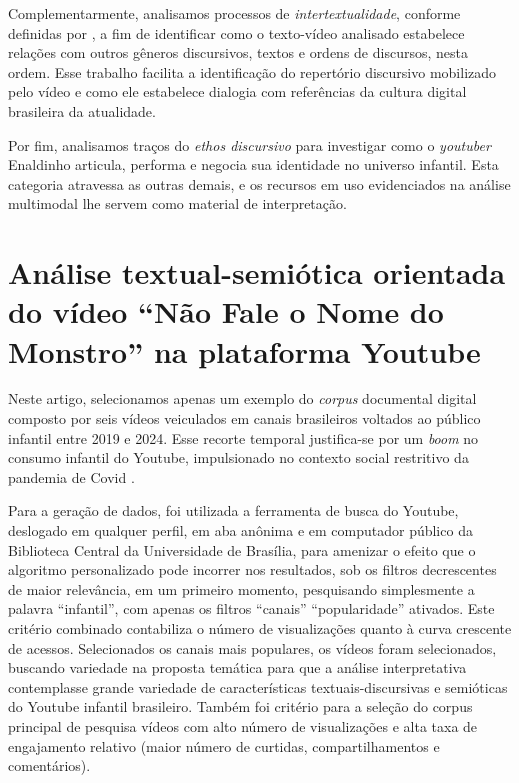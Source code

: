 \documentclass[portuguese]{textolivre}
\begin{document}
Complementarmente, analisamos processos de \textit{intertextualidade}, conforme definidas por \textcite{Fairclough2003AnalysingDiscourse}, a fim de identificar como o texto-vídeo analisado estabelece relações com outros gêneros discursivos, textos e ordens de discursos, nesta ordem. Esse trabalho facilita a identificação do repertório discursivo mobilizado pelo vídeo e como ele estabelece dialogia com referências da cultura digital brasileira da atualidade.

Por fim, analisamos traços do \textit{ethos discursivo} \cite{Maingueneau2020GenerosWeb} para investigar como o \textit{youtuber} Enaldinho articula, performa e negocia sua identidade no universo infantil. Esta categoria atravessa as outras demais, e os recursos em uso evidenciados na análise multimodal lhe servem como material de interpretação.

\section{Análise textual-semiótica orientada do vídeo “Não Fale o Nome do Monstro” na plataforma Youtube}\label{sec-fmt-manuscrito}
Neste artigo, selecionamos apenas um exemplo do \textit{corpus} documental digital composto por seis vídeos veiculados em canais brasileiros voltados ao público infantil entre 2019 e 2024. Esse recorte temporal justifica-se por um \textit{boom} no consumo infantil do Youtube, impulsionado no contexto social restritivo da pandemia de Covid \cite{FuenteAlbaVelosoVergara2021YouTubeInfantil}.

Para a geração de dados, foi utilizada a ferramenta de busca do Youtube, deslogado em qualquer perfil, em aba anônima e em computador público da Biblioteca Central da Universidade de Brasília, para amenizar o efeito que o algoritmo personalizado pode incorrer nos resultados, sob os filtros decrescentes de maior relevância, em um primeiro momento, pesquisando simplesmente a palavra “infantil”, com apenas os filtros “canais” “popularidade” ativados. Este critério combinado contabiliza o número de visualizações quanto à curva crescente de acessos. Selecionados os canais mais populares, os vídeos foram selecionados, buscando variedade na proposta temática para que a análise interpretativa contemplasse grande variedade de características textuais-discursivas e semióticas do Youtube infantil brasileiro. Também foi critério para a seleção do corpus principal de pesquisa vídeos com alto número de visualizações e alta taxa de engajamento relativo (maior número de curtidas, compartilhamentos e comentários).
\end{document}
